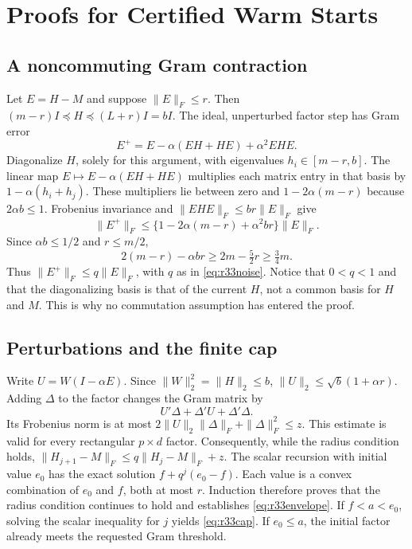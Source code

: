 \section{Proofs for Certified Warm Starts}\label{sec:r33proofs}
\subsection{A noncommuting Gram contraction}
Let $E=H-M$ and suppose $\|E\|_F\leq r$. Then
$(m-r)I\preceq H\preceq(L+r)I=bI$. The ideal, unperturbed factor step has
Gram error
\begin{equation}\label{eq:r33gramidentity}
 E^+=E-\alpha(EH+HE)+\alpha^2EHE.
\end{equation}
Diagonalize $H$, solely for this argument, with eigenvalues
$h_i\in[m-r,b]$. The linear map
$E\mapsto E-\alpha(EH+HE)$ multiplies each matrix entry in that basis by
$1-\alpha(h_i+h_j)$. These multipliers lie between zero and
$1-2\alpha(m-r)$ because $2\alpha b\leq1$. Frobenius invariance and
$\|EHE\|_F\leq br\|E\|_F$ give
\[
 \|E^+\|_F\leq
 \{1-2\alpha(m-r)+\alpha^2br\}\|E\|_F.
\]
Since $\alpha b\leq1/2$ and $r\leq m/2$,
\[
 2(m-r)-\alpha br\geq2m-\tfrac52r\geq\tfrac34m.
\]
Thus $\|E^+\|_F\leq q\|E\|_F$, with $q$ as in
\eqref{eq:r33noise}. Notice that $0<q<1$ and that the diagonalizing basis
is that of the current $H$, not a common basis for $H$ and $M$. This is why
no commutation assumption has entered the proof.

\subsection{Perturbations and the finite cap}
Write $U=W(I-\alpha E)$. Since $\|W\|_2^2=\|H\|_2\leq b$,
$\|U\|_2\leq\sqrt b(1+\alpha r)$. Adding $\Delta$ to the factor changes
the Gram matrix by
\[
 U'\Delta+\Delta'U+\Delta'\Delta.
\]
Its Frobenius norm is at most
$2\|U\|_2\|\Delta\|_F+\|\Delta\|_F^2\leq z$.
This estimate is valid for every rectangular $p\times d$ factor.
Consequently, while the radius condition holds,
$\|H_{j+1}-M\|_F\leq q\|H_j-M\|_F+z$.
The scalar recursion with initial value $e_0$ has the exact solution
$f+q^j(e_0-f)$. Each value is a convex combination of $e_0$ and $f$, both
at most $r$. Induction therefore proves that the radius condition continues
to hold and establishes \eqref{eq:r33envelope}. If $f<a<e_0$, solving the
scalar inequality for $j$ yields \eqref{eq:r33cap}. If $e_0\leq a$, the
initial factor already meets the requested Gram threshold.

